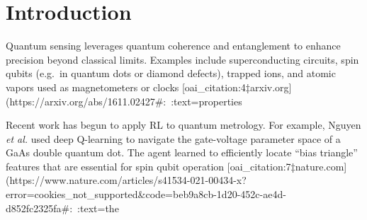 \documentclass[12pt]{article}
\begin{document}
\section{Introduction}
Quantum sensing leverages quantum coherence and entanglement to enhance precision beyond classical limits.  Examples include superconducting circuits, spin qubits (e.g.\ in quantum dots or diamond defects), trapped ions, and atomic vapors used as magnetometers or clocks [oai_citation:4‡arxiv.org](https://arxiv.org/abs/1611.02427#:~:text=properties%

Recent work has begun to apply RL to quantum metrology.  For example, Nguyen \textit{et al.} used deep Q-learning to navigate the gate-voltage parameter space of a GaAs double quantum dot.  The agent learned to efficiently locate ``bias triangle'' features that are essential for spin qubit operation [oai_citation:7‡nature.com](https://www.nature.com/articles/s41534-021-00434-x?error=cookies_not_supported&code=beb9a8cb-1d20-452c-ae4d-d852fc2325fa#:~:text=the%
\end{document}
